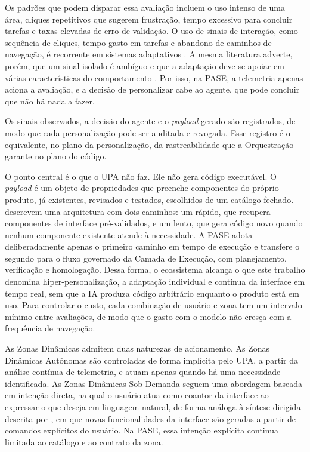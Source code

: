 Os padrões que podem disparar essa avaliação incluem o uso intenso de uma área, cliques repetitivos que sugerem frustração, tempo excessivo para concluir tarefas e taxas elevadas de erro de validação. O uso de sinais de interação, como sequência de cliques, tempo gasto em tarefas e abandono de caminhos de navegação, é recorrente em sistemas adaptativos \cite{tan2025alp,bieniek2024generative}. A mesma literatura adverte, porém, que um sinal isolado é ambíguo e que a adaptação deve se apoiar em várias características do comportamento \cite{tan2025alp}. Por isso, na PASE, a telemetria apenas aciona a avaliação, e a decisão de personalizar cabe ao agente, que pode concluir que não há nada a fazer.

Os sinais observados, a decisão do agente e o \textit{payload} gerado são registrados, de modo que cada personalização pode ser auditada e revogada. Esse registro é o equivalente, no plano da personalização, da rastreabilidade que a Orquestração garante no plano do código.

O ponto central é o que o UPA não faz. Ele não gera código executável. O \textit{payload} é um objeto de propriedades que preenche componentes do próprio produto, já existentes, revisados e testados, escolhidos de um catálogo fechado.  descrevem uma arquitetura com dois caminhos: um rápido, que recupera componentes de interface pré-validados, e um lento, que gera código novo quando nenhum componente existente atende à necessidade. A PASE adota deliberadamente apenas o primeiro caminho em tempo de execução e transfere o segundo para o fluxo governado da Camada de Execução, com planejamento, verificação e homologação. Dessa forma, o ecossistema alcança o que este trabalho denomina hiper-personalização, a adaptação individual e contínua da interface em tempo real, sem que a IA produza código arbitrário enquanto o produto está em uso. Para controlar o custo, cada combinação de usuário e zona tem um intervalo mínimo entre avaliações, de modo que o gasto com o modelo não cresça com a frequência de navegação.

As Zonas Dinâmicas admitem duas naturezas de acionamento. As Zonas Dinâmicas Autônomas são controladas de forma implícita pelo UPA, a partir da análise contínua de telemetria, e atuam apenas quando há uma necessidade identificada. As Zonas Dinâmicas Sob Demanda seguem uma abordagem baseada em intenção direta, na qual o usuário atua como coautor da interface ao expressar o que deseja em linguagem natural, de forma análoga à síntese dirigida descrita por , em que novas funcionalidades da interface são geradas a partir de comandos explícitos do usuário. Na PASE, essa intenção explícita continua limitada ao catálogo e ao contrato da zona.

